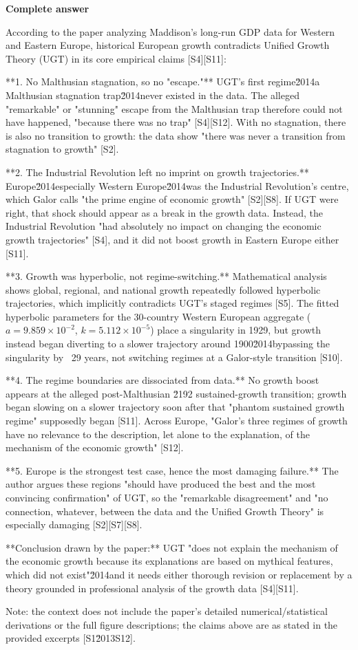 \documentclass[10pt]{article}
\begin{document}
\textbf{Complete answer}
\begin{AnswerText}
According to the paper analyzing Maddison's long-run GDP data for Western and Eastern Europe, historical European growth contradicts Unified Growth Theory (UGT) in its core empirical claims [S4][S11]:

**1. No Malthusian stagnation, so no "escape."** UGT's first regime\u2014a Malthusian stagnation trap\u2014never existed in the data. The alleged "remarkable" or "stunning" escape from the Malthusian trap therefore could not have happened, "because there was no trap" [S4][S12]. With no stagnation, there is also no transition to growth: the data show "there was never a transition from stagnation to growth" [S2].

**2. The Industrial Revolution left no imprint on growth trajectories.** Europe\u2014especially Western Europe\u2014was the Industrial Revolution's centre, which Galor calls "the prime engine of economic growth" [S2][S8]. If UGT were right, that shock should appear as a break in the growth data. Instead, the Industrial Revolution "had absolutely no impact on changing the economic growth trajectories" [S4], and it did not boost growth in Eastern Europe either [S11].

**3. Growth was hyperbolic, not regime-switching.** Mathematical analysis shows global, regional, and national growth repeatedly followed hyperbolic trajectories, which implicitly contradicts UGT's staged regimes [S5]. The fitted hyperbolic parameters for the 30-country Western European aggregate ($a = 9.859\times10^{-2}$, $k = 5.112\times10^{-5}$) place a singularity in 1929, but growth instead began diverting to a slower trajectory around 1900\u2014bypassing the singularity by ~29 years, not switching regimes at a Galor-style transition [S10].

**4. The regime boundaries are dissociated from data.** No growth boost appears at the alleged post-Malthusian \u2192 sustained-growth transition; growth began slowing on a slower trajectory soon after that "phantom sustained growth regime" supposedly began [S11]. Across Europe, "Galor's three regimes of growth have no relevance to the description, let alone to the explanation, of the mechanism of the economic growth" [S12].

**5. Europe is the strongest test case, hence the most damaging failure.** The author argues these regions "should have produced the best and the most convincing confirmation" of UGT, so the "remarkable disagreement" and "no connection, whatever, between the data and the Unified Growth Theory" is especially damaging [S2][S7][S8].

**Conclusion drawn by the paper:** UGT "does not explain the mechanism of the economic growth because its explanations are based on mythical features, which did not exist"\u2014and it needs either thorough revision or replacement by a theory grounded in professional analysis of the growth data [S4][S11].

Note: the context does not include the paper's detailed numerical/statistical derivations or the full figure descriptions; the claims above are as stated in the provided excerpts [S1\u2013S12].
\end{AnswerText}
\end{document}
